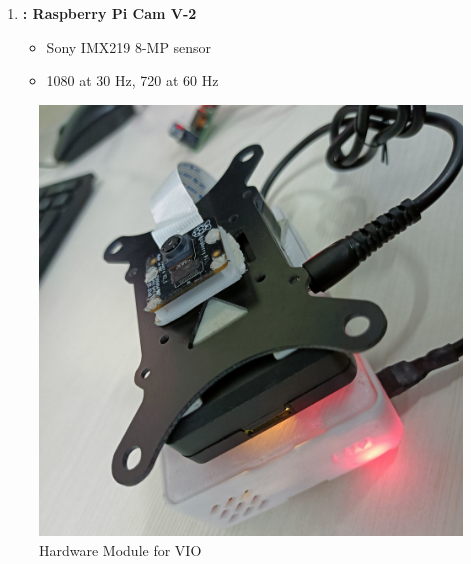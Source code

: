 \documentclass[10pt]{beamer}
\begin{document}
\begin{frame}{}
\begin{minipage}{0.47\textwidth}
\begin{enumerate}
    \item \textbf{ : Raspberry Pi Cam V-2 }
    \begin{itemize}
        \item Sony IMX219 8-MP sensor
        \item 1080 at 30 Hz, 720 at 60 Hz
    \end{itemize}  
\end{enumerate}
	\end{minipage}
	\begin{minipage}{0.47\textwidth}
		\begin{figure}[h!]
			\centering
			\includegraphics[scale=0.05]{VIO_module_1.jpg} 
			\caption{Hardware Module for VIO}
			\label{Fig:VIO_hardware_module}
		\end{figure}
	\end{minipage}
\end{frame}
\end{document}

